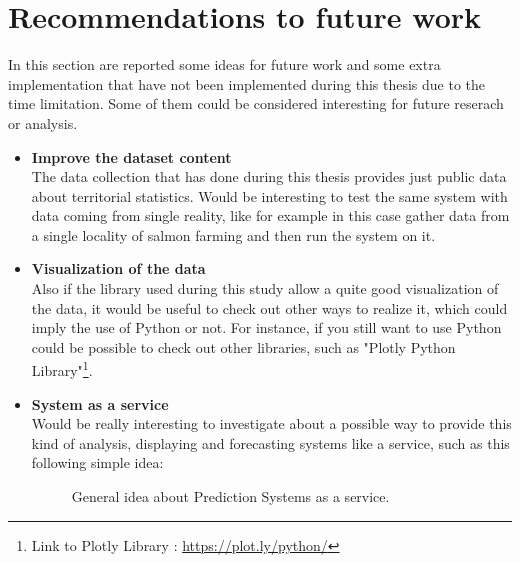 \section{Recommendations to future work}
\vspace{-5mm}
In this section are reported some ideas for future work and some extra implementation that have not been implemented during this thesis due to the time limitation. Some of them could be considered interesting for future reserach or analysis.
\begin{itemize}
\item \textbf{Improve the dataset content}\\ The data collection that has done during this thesis provides just public data about territorial statistics. Would be interesting to test the same system with data coming from single reality, like for example in this case gather data from a single locality of salmon farming and then run the system on it.
\item \textbf{Visualization of the data}\\ Also if the library used during this study allow a quite good visualization of the data, it would be useful to check out other ways to realize it, which could imply the use of Python or not. For instance, if you still want to use Python could be possible to check out other libraries, such as "Plotly Python Library"\footnote{Link to Plotly Library : \url{https://plot.ly/python/}}.
\item \textbf{System as a service}\\ Would be really interesting to investigate about a possible way to provide this kind of analysis, displaying and forecasting systems like a service, such as this following simple idea:\\

\begin{figure}[H]
	\centering
    \caption{General idea about Prediction Systems as a service.}
\end{figure}


\end{itemize}

